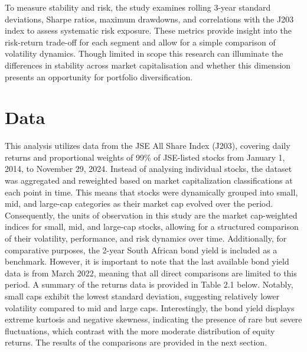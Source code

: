 \documentclass[12pt,preprint]{elsarticle}
\numberwithin{equation}{section}
\numberwithin{figure}{section}
\numberwithin{table}{section}
\begin{document}
To measure stability and risk, the study examines rolling 3-year
standard deviations, Sharpe ratios, maximum drawdowns, and correlations
with the J203 index to assess systematic risk exposure. These metrics
provide insight into the risk-return trade-off for each segment and
allow for a simple comparison of volatility dynamics. Though limited in
scope this research can illuminate the differences in stability across
market capitalisation and whether this dimension presents an opportunity
for portfolio diversification.

\section{\texorpdfstring{Data \label{Data}}{Data }}\label{data}

This analysis utilizes data from the JSE All Share Index (J203),
covering daily returns and proportional weights of 99\% of JSE-listed
stocks from January 1, 2014, to November 29, 2024. Instead of analysing
individual stocks, the dataset was aggregated and reweighted based on
market capitalization classifications at each point in time. This means
that stocks were dynamically grouped into small, mid, and large-cap
categories as their market cap evolved over the period. Consequently,
the units of observation in this study are the market cap-weighted
indices for small, mid, and large-cap stocks, allowing for a structured
comparison of their volatility, performance, and risk dynamics over
time. Additionally, for comparative purposes, the 2-year South African
bond yield is included as a benchmark. However, it is important to note
that the last available bond yield data is from March 2022, meaning that
all direct comparisons are limited to this period. A summary of the
returns data is provided in Table 2.1 below. Notably, small caps exhibit
the lowest standard deviation, suggesting relatively lower volatility
compared to mid and large caps. Interestingly, the bond yield displays
extreme kurtosis and negative skewness, indicating the presence of rare
but severe fluctuations, which contrast with the more moderate
distribution of equity returns. The results of the comparisons are
provided in the next section.
\end{document}
